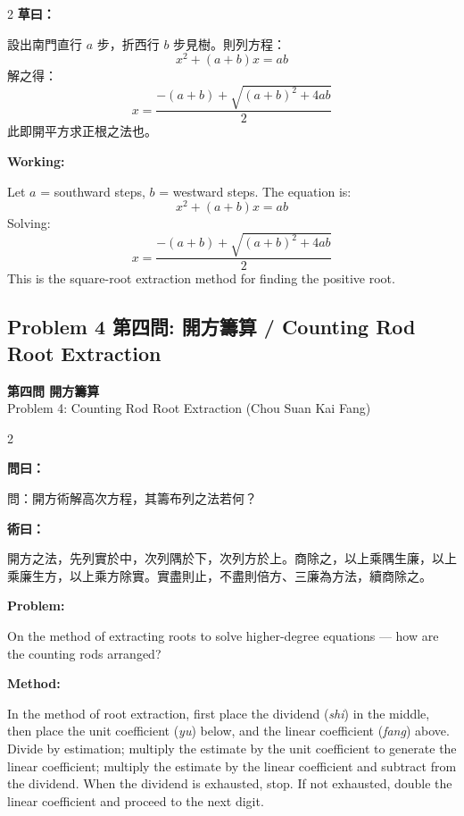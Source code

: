 \documentclass[11pt,a4paper]{article}
\newcommand{\wen}{\textbf{\color{sectioncolor}問}}
\newcommand{\shu}{\textbf{\color{methodcolor}術}}
\newcommand{\prob}{\textbf{\color{sectioncolor}Problem}}
\newcommand{\meth}{\textbf{\color{methodcolor}Method}}
\newcommand{\probheader}[2]{%
  \begin{center}
  \colorbox{problembg}{\parbox{\dimexpr\linewidth-4pt}{%
    \centering\smallskip
    {\large\bfseries\color{sectioncolor}#1}\\[0.3em]
    {\normalsize\color{subsectioncolor}#2}%
    \smallskip
  }}
  \end{center}
  \vspace{0.5em}
}
\newenvironment{zhmethod}{%
  \medskip\noindent{\color{methodcolor}\rule{0.9\columnwidth}{0.4pt}}%
  \par\color{methodcolor}\small
}{\par\medskip}
\newenvironment{enmethod}{%
  \medskip\noindent{\color{methodcolor}\rule{0.9\columnwidth}{0.4pt}}%
  \par\color{methodcolor}\small
}{\par\medskip}
\begin{document}
\begin{paracol}{2}
\switchcolumn[0]
\noindent\textbf{草曰：}

設出南門直行 $a$ 步，折西行 $b$ 步見樹。則列方程：
\[
x^2 + (a+b)x = ab
\]
解之得：
\[
x = \frac{-(a+b) + \sqrt{(a+b)^2 + 4ab}}{2}
\]
此即開平方求正根之法也。

\switchcolumn[1]
\noindent\textbf{Working:}

Let $a$ = southward steps, $b$ = westward steps. The equation is:
\[
x^2 + (a+b)x = ab
\]
Solving:
\[
x = \frac{-(a+b) + \sqrt{(a+b)^2 + 4ab}}{2}
\]
This is the square-root extraction method for finding the positive root.
\end{paracol}

\newpage

\subsection*{Problem 4 第四問: 開方籌算 / Counting Rod Root Extraction}

\probheader{第四問 開方籌算}{Problem 4: Counting Rod Root Extraction (Chou Suan Kai Fang)}

\begin{paracol}{2}

\switchcolumn[0]
\noindent\wen\textbf{曰：}

問：開方術解高次方程，其籌布列之法若何？

\begin{zhmethod}
\noindent\shu\textbf{曰：}

開方之法，先列實於中，次列隅於下，次列方於上。商除之，以上乘隅生廉，以上乘廉生方，以上乘方除實。實盡則止，不盡則倍方、三廉為方法，續商除之。
\end{zhmethod}

\switchcolumn[1]
\noindent\prob\textbf{:}

On the method of extracting roots to solve higher-degree equations --- how are the counting rods arranged?

\begin{enmethod}
\noindent\meth\textbf{:}

In the method of root extraction, first place the dividend (\textit{shi}) in the middle, then place the unit coefficient (\textit{yu}) below, and the linear coefficient (\textit{fang}) above. Divide by estimation; multiply the estimate by the unit coefficient to generate the linear coefficient; multiply the estimate by the linear coefficient and subtract from the dividend. When the dividend is exhausted, stop. If not exhausted, double the linear coefficient and proceed to the next digit.
\end{enmethod}

\end{paracol}
\end{document}
